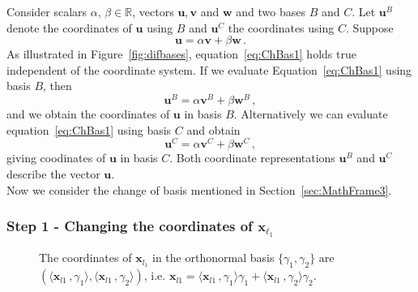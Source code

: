 \documentclass[letter,12pt]{article}
\begin{document}
{Consider scalars $\alpha, \, \beta \in \mathbb{R}$,  vectors $\bm{u}, \bm{v}$ and $\bm{w}$ and two bases $B$ and $C$. Let $\bm{u}^{B}$ denote the coordinates of $\bm{u}$ using $B$ and $\bm{u}^{C}$ the coordinates using $C$. Suppose 
\begin{equation}\label{eq:ChBas1}
     \bm{u} = \alpha \bm{v} + \beta \bm{w} \, . 
\end{equation}
As illustrated in Figure~\ref{fig:difbases}, equation~\eqref{eq:ChBas1} holds true independent of the coordinate system. If we evaluate Equation~\eqref{eq:ChBas1} using basis $B$, then 
\begin{equation}\label{eq:ChBas2}
     \bm{u}^B = \alpha \bm{v}^B + \beta \bm{w}^B \, , 
\end{equation}
and we obtain the coordinates of $\bm{u}$ in basis $B$. Alternatively we can evaluate equation~\eqref{eq:ChBas1} using basis $C$ and obtain 
\begin{equation}\label{eq:ChBas3}
     \bm{u}^C = \alpha \bm{v}^C + \beta \bm{w}^C \, , 
\end{equation}
giving coodinates of $\bm{u}$ in basis $C$. Both coordinate representations $\bm{u}^B$ and $\bm{u}^C$ describe the vector  $\bm{u}$.  \\

Now we consider the change of basis mentioned in Section~\ref{sec:MathFrame3}. 

\subsubsection{Step 1 - Changing the coordinates of $\bm{x}_{\ell_1}$ }
\begin{figure}
    \centering
    \caption{\color{blue} The coordinates of $\bm{x}_{l_1}$ in the orthonormal basis $\{\gamma_1, \gamma_2\}$ are $\left( \langle \bm{x}_{l1}\, ,  \gamma_{1} \rangle, \langle \bm{x}_{l1}\, ,  \gamma_{2} \rangle \right)$, i.e. $\bm{x}_{l1} = \langle \bm{x}_{l1}\, ,  \gamma_{1} \rangle \gamma_1 + \langle \bm{x}_{l1}\, ,  \gamma_{2} \rangle \gamma_2$.    }
    \label{fig:dotprodcoords}
\end{figure}


}
\end{document}
